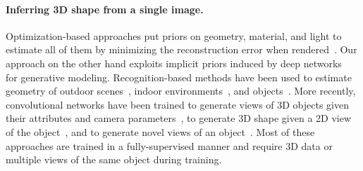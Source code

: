 \paragraph{Inferring 3D shape from a single image.} Optimization-based
approaches put priors on geometry, material, and light to estimate
all of them by minimizing the reconstruction error when
rendered~\cite{land1971lightness,barrow1978recovering,BarronTPAMI2015}.
Our approach on the other hand exploits implicit priors induced by
deep networks~\cite{deepshapeprior,bayesiandip} for generative modeling.
Recognition-based methods have been used to estimate geometry of
outdoor scenes~\cite{hoiem2005geometric,saxena2005learning}, indoor
environments~\cite{eigen2015predicting,schwing2012efficient}, and
objects~\cite{andriluka2010monocular,savarese20073d}.
More recently, convolutional networks have been trained to generate
views of 3D objects given their attributes and camera
parameters~\cite{dosovitskiy2015learning}, to generate 3D shape given
a 2D view of the object~\cite{tatarchenko2016multi}, and to generate
novel views of an object~\cite{zhou2016view}. Most of these approaches
are trained in a fully-supervised manner and require 3D data or
multiple views of the same object during training.



